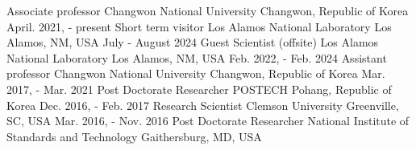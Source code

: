 

\begin{cventries}
  \cventry
  {Associate professor} %
  {Changwon National University}
  {Changwon, Republic of Korea} %
  {April. 2021, - present} %
  {
  }
  \cventry
  {Short term visitor} %
  {Los Alamos National Laboratory}
  {Los Alamos, NM, USA}
  {July - August 2024}
  {
  }
  \cventry
  {Guest Scientist (offsite)} %
  {Los Alamos National Laboratory}
  {Los Alamos, NM, USA}
  {Feb. 2022, - Feb. 2024} %
  {
  }
  \cventry
  {Assistant professor} %
  {Changwon National University}
  {Changwon, Republic of Korea} %
  {Mar. 2017, - Mar. 2021} %
  {
  }
  \cventry
  {Post Doctorate Researcher} %
  {POSTECH}
  {Pohang, Republic of Korea} %
  {Dec. 2016, - Feb. 2017} %
  {
  }
  \cventry
  {Research Scientist} %
  {Clemson University}
  {Greenville, SC, USA} %
  {Mar. 2016, - Nov. 2016} %
  {
  }
  \cventry
  {Post Doctorate Researcher} %
  {National Institute of Standards and Technology} %
  {Gaithersburg, MD, USA} %

\end{cventries}
